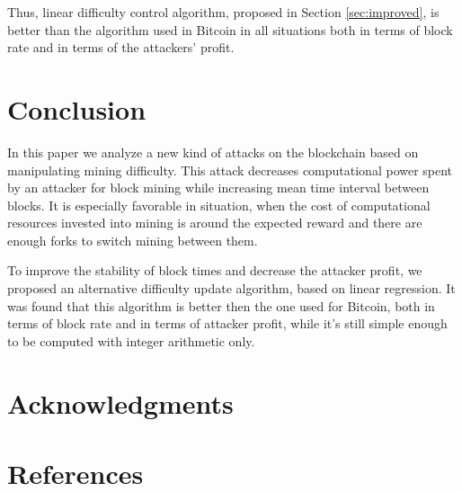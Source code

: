 \documentclass[number,preprint,review]{elsarticle}
\begin{document}
Thus, linear difficulty control algorithm, proposed in Section \ref{sec:improved}, is better than the algorithm used in Bitcoin in all situations both in terms of block rate and in terms of the attackers' profit.

\section{Conclusion}
\label{sec:concl}

In this paper we analyze a new kind of attacks on the blockchain based on manipulating mining difficulty.
This attack decreases computational power spent by an attacker for block mining while increasing mean time interval between blocks.
It is especially favorable in situation, when the cost of computational resources invested into mining is around the expected reward and there are enough forks to switch mining between them.

To improve the stability of block times and decrease the attacker profit, we proposed an alternative difficulty update algorithm, based on linear regression.
It was found that this algorithm is better then the one used for Bitcoin, both in terms of block rate and in terms of attacker profit, while it's still simple enough to be computed with integer arithmetic only.

\section*{Acknowledgments}

\section*{References}



\end{document}

